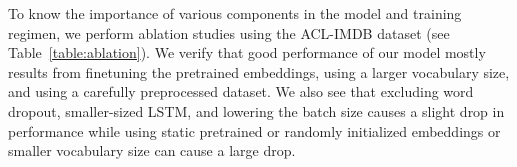 \documentclass[letterpaper]{article}
\begin{document}
\begin{table}[t]
\small
\centering
{}
\caption{Error rates (\%) of variations on the BiLSTM model trained using $L_{\textit{ML}}$ on the ACL-IMDB dataset. Unlisted values are identical to those of the first row; $N$ = number of BiLSTM layers; $H$ = LSTM hidden size.}
\label{table:ablation}
\end{table}

To know the importance of various components in the model and training regimen, we perform ablation studies using the ACL-IMDB dataset (see Table~\ref{table:ablation}). We verify that good performance of our model mostly results from finetuning the pretrained embeddings, using a larger vocabulary size, and using a carefully preprocessed dataset. We also see that excluding word dropout, smaller-sized LSTM, and lowering the batch size causes a slight drop in performance while using static pretrained or randomly initialized embeddings or smaller vocabulary size can cause a large drop.
\end{document}
